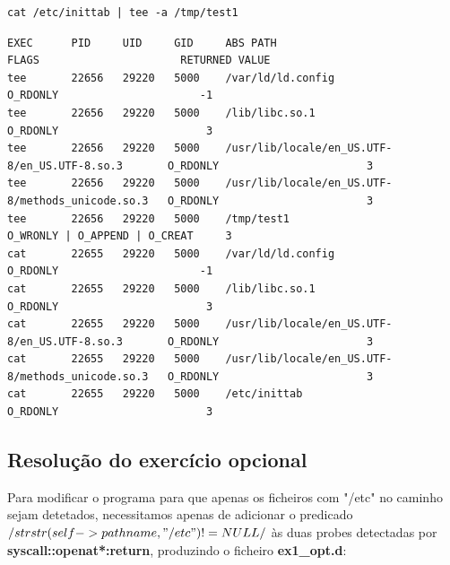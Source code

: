 \documentclass[a4paper]{article}
\begin{document}
\begin{lstlisting}[style=command]
cat /etc/inittab | tee -a /tmp/test1
\end{lstlisting}
\par 
\begin{lstlisting}[style=esc]
EXEC      PID     UID     GID     ABS PATH                                          FLAGS                      RETURNED VALUE
tee       22656   29220   5000    /var/ld/ld.config                                  O_RDONLY                      -1
tee       22656   29220   5000    /lib/libc.so.1                                     O_RDONLY                       3
tee       22656   29220   5000    /usr/lib/locale/en_US.UTF-8/en_US.UTF-8.so.3       O_RDONLY                       3
tee       22656   29220   5000    /usr/lib/locale/en_US.UTF-8/methods_unicode.so.3   O_RDONLY                       3
tee       22656   29220   5000    /tmp/test1                                         O_WRONLY | O_APPEND | O_CREAT     3
cat       22655   29220   5000    /var/ld/ld.config                                  O_RDONLY                      -1
cat       22655   29220   5000    /lib/libc.so.1                                     O_RDONLY                       3
cat       22655   29220   5000    /usr/lib/locale/en_US.UTF-8/en_US.UTF-8.so.3       O_RDONLY                       3
cat       22655   29220   5000    /usr/lib/locale/en_US.UTF-8/methods_unicode.so.3   O_RDONLY                       3
cat       22655   29220   5000    /etc/inittab                                       O_RDONLY                       3
\end{lstlisting}

\subsection{Resolução do exercício opcional}
Para modificar o programa para que apenas os ficheiros com "/etc" no caminho sejam detetados, necessitamos apenas de adicionar o predicado \textbf{$/strstr(self->pathname,"/etc") != NULL/$} às duas probes detectadas por \textbf{syscall::openat*:return}, produzindo o ficheiro \textbf{ex1\_opt.d}:
\end{document}
